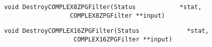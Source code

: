 \vspace{-0.1in}
\begin{verbatim}
void DestroyCOMPLEX8ZPGFilter(Status            *stat,
			      COMPLEX8ZPGFilter **input)
\end{verbatim}
\vspace{-0.1in}
\begin{verbatim}
void DestroyCOMPLEX16ZPGFilter(Status             *stat,
			       COMPLEX16ZPGFilter **input)
\end{verbatim}

